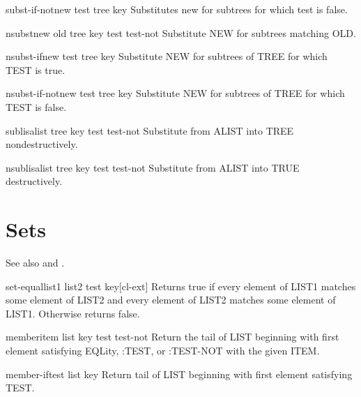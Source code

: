 \documentclass[10pt,english]{book}
\begin{document}
\begin{function}{subst-if-not}{new test tree \key key}
  Substitutes new for subtrees for which test is false.
\end{function}

\begin{function}{nsubst}{new old tree \key key test test-not}
  Substitute NEW for subtrees matching OLD.
\end{function}

\begin{function}{nsubst-if}{new test tree \key key}
  Substitute NEW for subtrees of TREE for which TEST is true.
\end{function}

\begin{function}{nsubst-if-not}{new test tree \key key}
  Substitute NEW for subtrees of TREE for which TEST is false.
\end{function}

\begin{function}{sublis}{alist tree \key key test test-not}
  Substitute from ALIST into TREE nondestructively.
\end{function}

\begin{function}{nsublis}{alist tree \key key test test-not}
  Substitute from ALIST into TRUE destructively.
\end{function}

\section{Sets}
\label{sec:sets}

See also  and .

\begin{function}{set-equal}{list1 list2 \key test key}[cl-ext]
  Returns true if every element of LIST1 matches some element of LIST2 and
every element of LIST2 matches some element of LIST1. Otherwise returns false.
\end{function}

\begin{function}{member}{item list \key key test test-not}
  Return the tail of LIST beginning with first element satisfying EQLity,
   :TEST, or :TEST-NOT with the given ITEM.
\end{function}

\begin{function}{member-if}{test list \key key}
  Return tail of LIST beginning with first element satisfying TEST.
\end{function}
\end{document}
